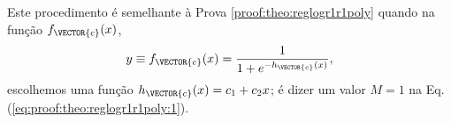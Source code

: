 
\begin{myproofT}\label{proof:theo:reglogr1r1}
Este procedimento é semelhante à Prova \ref{proof:theo:reglogr1r1poly} quando
na função $f_{\VECTOR{c}}(x)$,
\begin{equation}
y\equiv f_{\VECTOR{c}}(x)= \frac{1}{1+e^{-h_{\VECTOR{c}}(x) }},
\end{equation}
escolhemos uma função $h_{\VECTOR{c}}(x)= c_1 +c_2 x$;
é dizer um valor $M=1$ na Eq. (\ref{eq:proof:theo:reglogr1r1poly:1}).
\end{myproofT}

